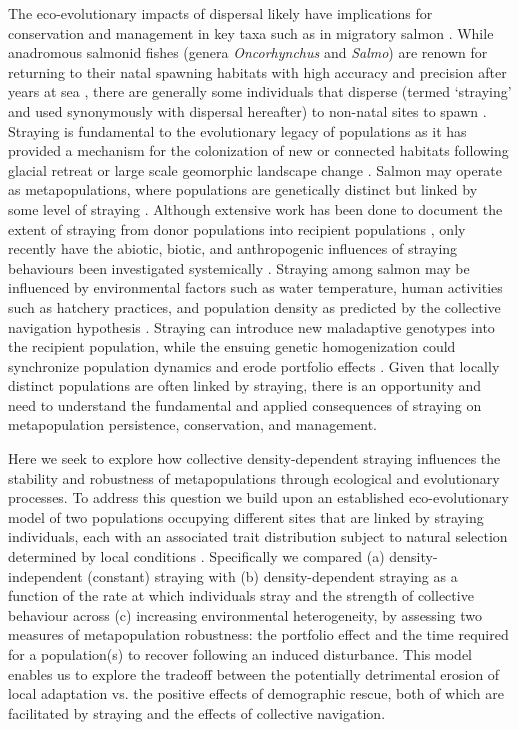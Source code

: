 \documentclass{revtex4}
\begin{document}
The eco-evolutionary impacts of dispersal likely have implications for conservation and management in key taxa such as in migratory salmon \citep{Brenner:2012gl,Johnson:2012fe,Fullerton:2011ii}.
While anadromous salmonid fishes (genera \emph{Oncorhynchus} and \emph{Salmo}) are renown for returning to their natal spawning habitats with high accuracy and precision after years at sea \citep{Quinn:2011tf,Jonsson:2011kg,Keefer:2014gg}, there are generally some individuals that disperse (termed `straying' and used synonymously with dispersal hereafter) to non-natal sites to spawn \citep{Quinn:1993ge,Hendry:2004wf}.
Straying is fundamental to the evolutionary legacy of populations as it has provided a mechanism for the colonization of new or connected habitats following glacial retreat or large scale geomorphic landscape change \citep{Hendry:2004wf}.
Salmon may operate as metapopulations, where populations are genetically distinct but linked by some level of straying \citep{Schtickzelle:2007wb,Anderson:2014cx}.
Although extensive work has been done to document the extent of straying from donor populations into recipient populations \citep{Keefer:2014gg,Bett:2017ha}, only recently have the abiotic, biotic, and anthropogenic influences of straying behaviours been investigated systemically \citep{Keefer:2008bs,Westley:2015to,Bond:2016dz}.
Straying among salmon may be influenced by environmental factors such as water temperature, human activities such as hatchery practices, and population density as predicted by the collective navigation hypothesis \citep{Peterson:2014gy,Berdahl:2017uu}.
Straying can introduce new maladaptive genotypes into the recipient population, while the ensuing genetic homogenization could synchronize population dynamics and erode portfolio effects \citep{Moore:2010gs,Carlson:2011ce,Braun:2016ib}.
Given that locally distinct populations are often linked by straying, there is an opportunity and need to understand the fundamental and applied consequences of straying on metapopulation persistence, conservation, and management.

Here we seek to explore how collective density-dependent straying influences the stability and robustness of metapopulations through ecological and evolutionary processes.
To address this question we build upon an established eco-evolutionary model of two populations occupying different sites that are linked by straying individuals, each with an associated trait distribution subject to natural selection determined by local conditions \citep{Ronce:2001dp}.
Specifically we compared (a) density-independent (constant) straying with (b) density-dependent straying as a function of the rate at which individuals stray and the strength of collective behaviour across (c) increasing environmental heterogeneity, by assessing two measures of metapopulation robustness: the portfolio effect and the time required for a population(s) to recover following an induced disturbance. 
This model enables us to explore the tradeoff between the potentially detrimental erosion of local adaptation vs. the positive effects of demographic rescue, both of which are facilitated by straying and the effects of collective navigation. 
\end{document}
